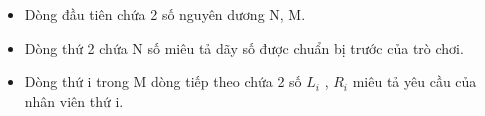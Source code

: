 \begin{itemize}
	\item Dòng đầu tiên chứa 2 số nguyên dương N, M.
	\item Dòng thứ 2 chứa N số miêu tả dãy số được chuẩn bị trước của trò chơi.
	\item Dòng thứ i trong M dòng tiếp theo chứa 2 số $L_{i}$ , $R_{i}$ miêu tả yêu cầu của nhân viên thứ i.
\end{itemize}